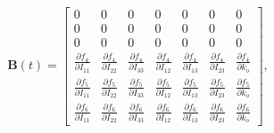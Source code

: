 \documentclass[pdflatex,sn-mathphys-num]{sn-jnl}%
\theoremstyle{thmstyleone}%
\theoremstyle{thmstyletwo}%
\theoremstyle{thmstylethree}%
\renewcommand{\vec}[1]{\boldsymbol{#1}}
\begin{document}
	
	
\begin{equation}
\vec{B}(t) = 
\begin{bmatrix}
0 & 0 & 0 & 0 & 0 & 0 & 0 \\
0 & 0 & 0 & 0 & 0 & 0 & 0 \\
0 & 0 & 0 & 0 & 0 & 0 & 0 \\
\frac{\partial f_4}{\partial I_{11}} &
\frac{\partial f_4}{\partial I_{22}} &
\frac{\partial f_4}{\partial I_{33}} &
\frac{\partial f_4}{\partial I_{12}} &
\frac{\partial f_4}{\partial I_{13}} &
\frac{\partial f_4}{\partial I_{23}} &
\frac{\partial f_4}{\partial k_{\mathrm{o}}} \\
\frac{\partial f_5}{\partial I_{11}} &
\frac{\partial f_5}{\partial I_{22}} &
\frac{\partial f_5}{\partial I_{33}} &
\frac{\partial f_5}{\partial I_{12}} &
\frac{\partial f_5}{\partial I_{13}} &
\frac{\partial f_5}{\partial I_{23}} &
\frac{\partial f_5}{\partial k_{\mathrm{o}}} \\
\frac{\partial f_6}{\partial I_{11}} &
\frac{\partial f_6}{\partial I_{22}} &
\frac{\partial f_6}{\partial I_{33}} &
\frac{\partial f_6}{\partial I_{12}} &
\frac{\partial f_6}{\partial I_{13}} &
\frac{\partial f_6}{\partial I_{23}} &
\frac{\partial f_6}{\partial k_{\mathrm{o}}}
\end{bmatrix},
\end{equation}
	
\end{document}
